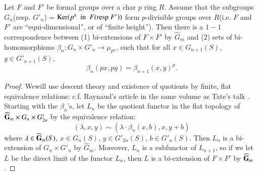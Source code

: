 \begin{proposition}\label{art15-prop4}
Let $F$ and $F'$ be formal groups over a {\rm char} $p$ ring $R$. Assume that the subgroups $G_{n}$(resp. $G'_{n}$) = $\operatorname{\mathrm{Ker}} (p^{n}\text{~ in~ } F(\text{resp } F'))$ form $p$-divisible groups over $R$(i.e. $F$ and $F'$ are ``equi-dimensional'', or of ``finite height''). Then there is a $1-1$ correspondence between {\rm(1)} bi-extensions of $F\times F'$ by $\widehat{G}_{m}$ and {\rm(2)} sets of bi-homomorphisms $\beta_{n}:G_{n}\times G'_{n}\to \mu_{p^{n}}$, such that for all $x\in G_{n+1}(S)$, $y\in G'_{n+1}(S)$,
$$
\beta_{n}(px,py)=\beta_{n+1}(x,y)^{p}.
$$
\end{proposition}

\begin{proof}
We\pageoriginale will use descent theory and existence of quotients by finite, flat equivalence relations: c.f. Raynaud's article in the same volume as Tate's talk \cite{art15-key6}. Starting with the $\beta_{n}$'s, let $L_{n}$ be the quotient functor in the flat topology of $\widehat{\mathbf{G}}_{m}\times G_{n}\times G'_{2n}$ by the equivalence relation:
$$
(\lambda,x,y)\sim (\lambda\cdot \beta_{n}(x,b),x,y+b)
$$
where $\lambda\in \widehat{\mathbf{G}}_{m}(S)$, $x\in G_{n}(S)$, $y\in G'_{2n}(S)$, $b\in G'_{n}(S)$. Then $L_{n}$ is a bi-extension of $G_{n}\times G'_{n}$ by $\widehat{G}_{m}$. Moreover, $L_{n}$ is a subfunctor of $L_{n+1}$, so if we let $L$ be the direct limit of the functor $L_{n}$, then $L$ is a bi-extension of $F\times F'$ by $\widehat{\mathbf{G}}_{m}$.


\end{proof}
